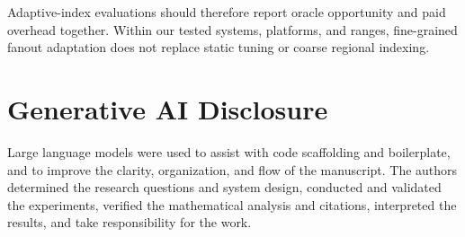 \documentclass[sigconf,review,anonymous]{acmart}
\begin{document}
Adaptive-index evaluations should therefore report oracle opportunity and paid
overhead together.  Within our tested systems, platforms, and ranges,
fine-grained fanout adaptation does not replace static tuning or coarse regional
indexing.

\section*{Generative AI Disclosure}
Large language models were used to assist with code scaffolding and
boilerplate, and to improve the clarity, organization, and flow of the
manuscript.  The authors determined the research questions and system design,
conducted and validated the experiments, verified the mathematical analysis
and citations, interpreted the results, and take responsibility for the work.



\end{document}
